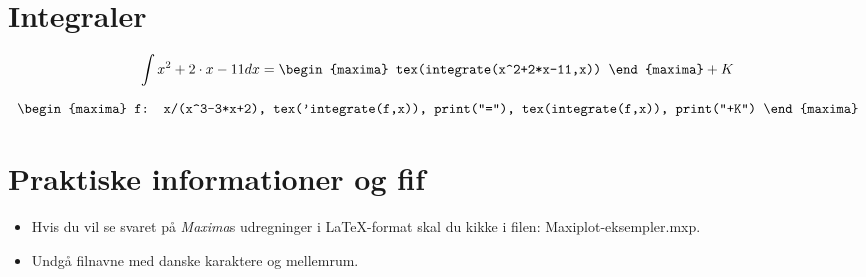 \documentclass[12pt,a4paper]{article}
\def\Maxima{\emph{Maxima}}
\begin{document}
\section*{Integraler}

$$\int x^2 + 2 \cdot x  -11 dx = 
\begin{maxima}
 tex(integrate(x^2+2*x-11,x))
\end{maxima} + K$$
 
$$\begin{maxima}
  f: x/(x^3-3*x+2),
  tex('integrate(f,x)),
  print("="),
  tex(integrate(f,x)),
  print("+K")
\end{maxima}$$

\section*{Praktiske informationer og fif}

\begin{itemize}
  \item{Hvis du vil se svaret på \Maxima{}s udregninger i \LaTeX{}-format skal du kikke i filen: Maxiplot-eksempler.mxp.}
  \item{Undgå filnavne med danske karaktere og mellemrum.}
\end{itemize}  
\end{document}
